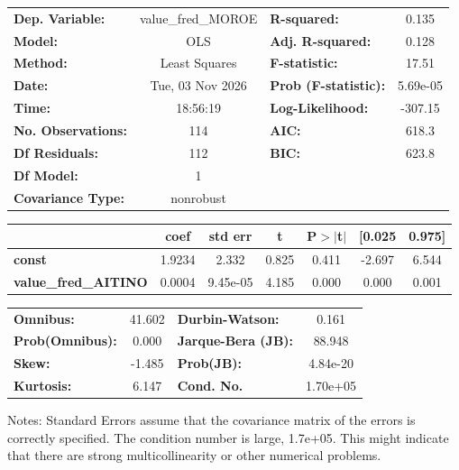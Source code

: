 \begin{center}
\begin{tabular}{lclc}
\toprule
\textbf{Dep. Variable:}      & value\_fred\_MOROE & \textbf{  R-squared:         } &     0.135   \\
\textbf{Model:}              &        OLS         & \textbf{  Adj. R-squared:    } &     0.128   \\
\textbf{Method:}             &   Least Squares    & \textbf{  F-statistic:       } &     17.51   \\
\textbf{Date:}               &  Tue, 03 Nov 2026  & \textbf{  Prob (F-statistic):} &  5.69e-05   \\
\textbf{Time:}               &      18:56:19      & \textbf{  Log-Likelihood:    } &   -307.15   \\
\textbf{No. Observations:}   &          114       & \textbf{  AIC:               } &     618.3   \\
\textbf{Df Residuals:}       &          112       & \textbf{  BIC:               } &     623.8   \\
\textbf{Df Model:}           &            1       & \textbf{                     } &             \\
\textbf{Covariance Type:}    &     nonrobust      & \textbf{                     } &             \\
\bottomrule
\end{tabular}
\begin{tabular}{lcccccc}
                             & \textbf{coef} & \textbf{std err} & \textbf{t} & \textbf{P$> |$t$|$} & \textbf{[0.025} & \textbf{0.975]}  \\
\midrule
\textbf{const}               &       1.9234  &        2.332     &     0.825  &         0.411        &       -2.697    &        6.544     \\
\textbf{value\_fred\_AITINO} &       0.0004  &     9.45e-05     &     4.185  &         0.000        &        0.000    &        0.001     \\
\bottomrule
\end{tabular}
\begin{tabular}{lclc}
\textbf{Omnibus:}       & 41.602 & \textbf{  Durbin-Watson:     } &    0.161  \\
\textbf{Prob(Omnibus):} &  0.000 & \textbf{  Jarque-Bera (JB):  } &   88.948  \\
\textbf{Skew:}          & -1.485 & \textbf{  Prob(JB):          } & 4.84e-20  \\
\textbf{Kurtosis:}      &  6.147 & \textbf{  Cond. No.          } & 1.70e+05  \\
\bottomrule
\end{tabular}
\end{center}

Notes: \newline
 [1] Standard Errors assume that the covariance matrix of the errors is correctly specified. \newline
 [2] The condition number is large, 1.7e+05. This might indicate that there are \newline
 strong multicollinearity or other numerical problems.